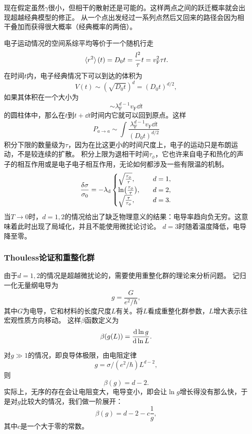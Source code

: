 \documentclass[hyperref, UTF8, a4paper]{ctexart}
\begin{document}
现在假定虽然$\gamma$很小，但相干的散射还是可能的。这样两点之间的跃迁概率就会出现超越经典模型的修正。
从一个点出发经过一系列点然后又回来的路径会因为相干叠加而获得很大概率（经典概率的两倍）。

电子运动情况的空间系综平均等价于一个随机行走
\[
    \expval*{r^2}(t) = D_0 t = \frac{l^2}{\tau} t = v_\text{F}^2 \tau t.
\]
在时间$t$内，电子经典情况下可以到达的体积为
\[
    V(t) \sim (\sqrt{D_0 t})^d = (D_0 t)^{d/2},
\]
如果其体积在一个大小为
\[
    \sim \lambda_\text{F}^{d-1} v_\text{F} \dd{t}
\]
的圆柱体中，那么在$t$到$t+\dd{t}$时间内它就可以回到原点。这样
\[
    P_{a \to a} \sim \int \frac{\lambda_\text{F}^{d-1} v_\text{F} \dd{t}}{(D_0 t)^{d/2}} 
\]
积分下限的数量级为$\tau$，因为在比这更小的时间尺度上，电子的运动只是布朗运动，不是较连续的扩散。
积分上限为退相干时间$\tau_\phi$，它也许来自电子和热化的声子的相互作用或是电子电子相互作用，无论如何都涉及一些有限温的机制。
\[
    \frac{\var{\sigma}}{\sigma_0} = - \lambda_\text{d} \begin{cases}
        \sqrt{\frac{\tau_\phi}{\tau}}, \quad &d = 1, \\
        \ln(\frac{\tau_\phi}{\tau}) , \quad &d = 2, \\
        \sqrt{\frac{\tau}{\tau_\phi}} , \quad &d = 3.
    \end{cases}
\]
当$T\to 0$时，$d=1, 2$的情况给出了缺乏物理意义的结果：电导率趋向负无穷。这意味着此时出现了局域化，并且不能使用微扰论讨论。
$d=3$时随着温度降低，电导降至零。

\subsubsection{Thouless论证和重整化群}

由于$d=1, 2$的情况是超越微扰论的，需要使用重整化群的理论来分析问题。
记归一化无量纲电导为
\begin{equation}
    g = \frac{G}{e^2 / \hbar},
\end{equation}
其中$G$为电导，它和材料的长度尺度$L$有关。将$L$看成重整化群参数，$L$增大表示往宏观性质方向移动。
这样$\beta$函数定义为
\begin{equation}
    \beta(g(L)) = \dv{\ln g}{\ln L}.    
\end{equation}

对$g \gg 1$的情况，即良导体极限，由电阻定律
\[
    g = \sigma / (e^2 / \hbar) L^{d-2},
\]
则
\[
    \beta(g) = d - 2.
\]
实际上，无序的存在会让电阻变大，电导变小，即会让$\ln g$增长得没有那么快，于是对$g$比较大的情况，我们做一阶展开：
\begin{equation}
    \beta(g) = d - 2 - c \frac{1}{g},
    \label{eq:disorder-rg-large-g}
\end{equation}
其中$c$是一个大于零的常数。
\end{document}
